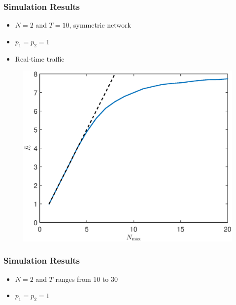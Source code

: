 \documentclass{beamer}
\begin{document}
\begin{frame}
\frametitle{Simulation Results}
\begin{itemize}
\item $N=2$ and $T=10$, symmetric network
\item $p_1 = p_2 = 1$
\item Real-time traffic
\end{itemize}
\begin{figure}
\centering
\includegraphics[scale=0.35]{realtime_throughput_randmax.eps}
\end{figure}
\end{frame}

\begin{frame}
\frametitle{Simulation Results}
\begin{itemize}
\item $N=2$ and $T$ ranges from $10$ to $30$
\item $p_1 = p_2 = 1$
\end{itemize}
\end{frame}
\end{document}
